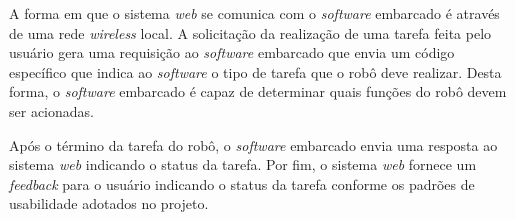 A forma em que o sistema \textit{web} se comunica com o \textit{software} embarcado é através de uma rede \textit{wireless} local. A solicitação da realização de uma tarefa feita pelo usuário gera uma requisição ao \textit{software} embarcado que envia um código específico que indica ao \textit{software} o tipo de tarefa que o robô deve realizar. Desta forma, o \textit{software} embarcado é capaz de determinar quais funções do robô devem ser acionadas.

Após o término da tarefa do robô, o \textit{software} embarcado envia uma resposta ao sistema \textit{web} indicando o status da tarefa. Por fim, o sistema \textit{web} fornece um \textit{feedback} para o usuário indicando o status da tarefa conforme os padrões de usabilidade adotados no projeto.
